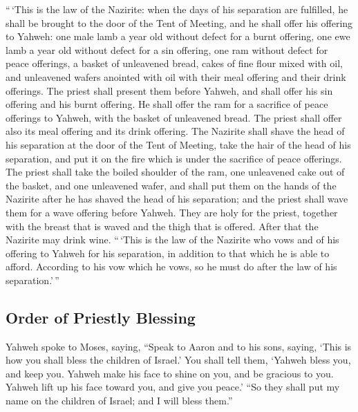  ``\,`This is the law of the Nazirite: when the days of
his separation are fulfilled, he shall be brought to the door of the
Tent of Meeting,  and he shall offer his offering to
Yahweh: one male lamb a year old without defect for a burnt offering,
one ewe lamb a year old without defect for a sin offering, one ram
without defect for peace offerings,  a basket of
unleavened bread, cakes of fine flour mixed with oil, and unleavened
wafers anointed with oil with their meal offering and their drink
offerings.  The priest shall present them before Yahweh,
and shall offer his sin offering and his burnt offering. 
He shall offer the ram for a sacrifice of peace offerings to Yahweh,
with the basket of unleavened bread. The priest shall offer also its
meal offering and its drink offering.  The Nazirite shall
shave the head of his separation at the door of the Tent of Meeting,
take the hair of the head of his separation, and put it on the fire
which is under the sacrifice of peace offerings.  The
priest shall take the boiled shoulder of the ram, one unleavened cake
out of the basket, and one unleavened wafer, and shall put them on the
hands of the Nazirite after he has shaved the head of his separation;
 and the priest shall wave them for a wave offering
before Yahweh. They are holy for the priest, together with the breast
that is waved and the thigh that is offered. After that the Nazirite may
drink wine.  ``\,`This is the law of the Nazirite who
vows and of his offering to Yahweh for his separation, in addition to
that which he is able to afford. According to his vow which he vows, so
he must do after the law of his separation.'\,''

\hypertarget{order-of-priestly-blessing}{%
\subsection{Order of Priestly
Blessing}\label{order-of-priestly-blessing}}

 Yahweh spoke to Moses, saying,  ``Speak
to Aaron and to his sons, saying, `This is how you shall bless the
children of Israel.' You shall tell them,  `Yahweh bless
you, and keep you.  Yahweh make his face to shine on you,
and be gracious to you.  Yahweh lift up his face toward
you, and give you peace.'  ``So they shall put my name on
the children of Israel; and I will bless them.''

